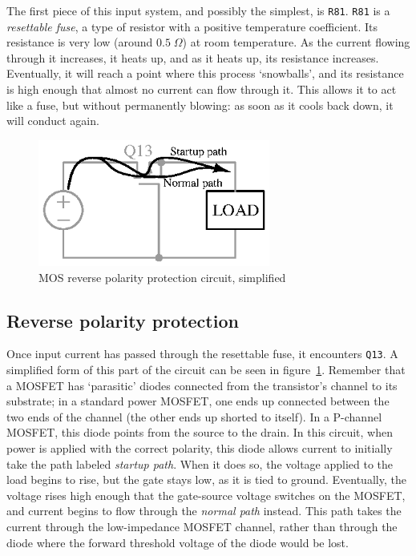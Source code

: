 \documentclass[article]{memoir}
\newcommand{\refdes}[1]{\texttt{#1}}
\begin{document}
\begin{multicols}{2}
The first piece of this input system, and possibly the simplest, is
\refdes{R81}. \refdes{R81} is a \emph{resettable fuse}, a type of resistor
with a positive temperature coefficient. Its resistance is very low
(around $0.5\;\Omega$) at room temperature.  As the current flowing through it
increases, it heats up, and as it heats up, its resistance increases.
Eventually, it will reach a point where this process `snowballs', and its
resistance is high enough that almost no current can flow through it. This
allows it to act like a fuse, but without permanently blowing: as soon as it
cools back down, it will conduct again.

\begin{figure}[H]
\centering
\includegraphics[width=3in]{mosrpp}
\caption{MOS reverse polarity protection circuit, simplified}
\label{fig:mosrpp}
\end{figure}

\subsection{Reverse polarity protection}

Once input current has passed through the resettable fuse, it encounters
\refdes{Q13}. A simplified form of this part of the circuit can be seen in
figure~\ref{fig:mosrpp}. Remember that a MOSFET has `parasitic' diodes
connected from the transistor's channel to its substrate; in a
standard power MOSFET, one ends up connected between the two ends of the
channel (the other ends up shorted to itself). In a P-channel MOSFET, this
diode points from the source to the drain. In this circuit, when power is
applied with the correct polarity, this diode allows current to initially take
the path labeled \emph{startup path}. When it does so, the voltage applied to
the load begins to rise, but the gate stays low, as it is tied to ground.
Eventually, the voltage rises high enough that the gate-source voltage switches
on the MOSFET, and current begins to flow through the \emph{normal path}
instead. This path takes the current through the low-impedance MOSFET channel,
rather than through the diode where the forward threshold voltage of the diode
would be lost.


\end{multicols}
\end{document}
